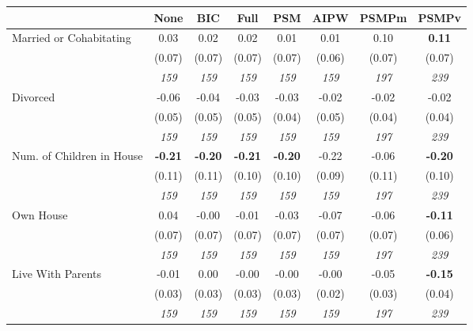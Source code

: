\begin{tabular}{l c c c c c c c}
\toprule
 & None & BIC & Full & PSM & AIPW & PSMPm & PSMPv \\
\midrule
Married or Cohabitating & 0.03 & 0.02 & 0.02 & 0.01 & 0.01 & 0.10 & \textbf{0.11} \\
& (0.07) & (0.07) & (0.07) & (0.07) & (0.06) & (0.07) & (0.07) \\
& \textit{ 159 } & \textit{ 159 } & \textit{ 159 } & \textit{ 159 } & \textit{ 159 } & \textit{ 197 } & \textit{ 239 } \\
Divorced & -0.06 & -0.04 & -0.03 & -0.03 & -0.02 & -0.02 & -0.02 \\
& (0.05) & (0.05) & (0.05) & (0.04) & (0.05) & (0.04) & (0.04) \\
& \textit{ 159 } & \textit{ 159 } & \textit{ 159 } & \textit{ 159 } & \textit{ 159 } & \textit{ 197 } & \textit{ 239 } \\
Num. of Children in House & \textbf{ -0.21 } & \textbf{ -0.20 } & \textbf{ -0.21 } & \textbf{-0.20} & -0.22 & -0.06 & \textbf{-0.20} \\
& (0.11) & (0.11) & (0.10) & (0.10) & (0.09) & (0.11) & (0.10) \\
& \textit{ 159 } & \textit{ 159 } & \textit{ 159 } & \textit{ 159 } & \textit{ 159 } & \textit{ 197 } & \textit{ 239 } \\
Own House & 0.04 & -0.00 & -0.01 & -0.03 & -0.07 & -0.06 & \textbf{-0.11} \\
& (0.07) & (0.07) & (0.07) & (0.07) & (0.07) & (0.07) & (0.06) \\
& \textit{ 159 } & \textit{ 159 } & \textit{ 159 } & \textit{ 159 } & \textit{ 159 } & \textit{ 197 } & \textit{ 239 } \\
Live With Parents & -0.01 & 0.00 & -0.00 & -0.00 & -0.00 & -0.05 & \textbf{-0.15} \\
& (0.03) & (0.03) & (0.03) & (0.03) & (0.02) & (0.03) & (0.04) \\
& \textit{ 159 } & \textit{ 159 } & \textit{ 159 } & \textit{ 159 } & \textit{ 159 } & \textit{ 197 } & \textit{ 239 } \\
\bottomrule
\end{tabular}
